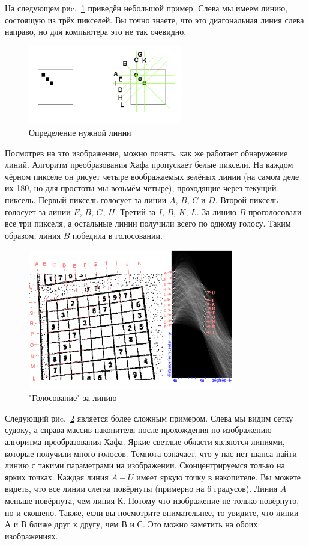 На следующем риc.~\ref{fig:fig26} приведён небольшой пример. Слева мы имеем линию, состоящую из трёх пикселей. Вы точно знаете, что это диагональная линия слева направо, но для компьютера это не так очевидно. 
\begin{figure}[ht!]
  \centering
  \includegraphics[width=0.6\textwidth]{inc/raster/design2-6.png}
  \caption{Определение нужной линии}
  \label{fig:fig26}
\end{figure}

Посмотрев на это изображение, можно понять, как же работает обнаружение линий. Алгоритм преобразования Хафа пропускает белые пиксели. На каждом чёрном пикселе он рисует четыре воображаемых зелёных линии (на самом деле их 180, но для простоты мы возьмём четыре), проходящие через текущий пиксель. Первый пиксель голосует за линии $A$, $B$, $C$ и $D$. Второй пиксель голосует за линии $E$, $B$, $G$, $H$. Третий за $I$, $B$, $K$, $L$. За линию $B$ проголосовали все три пикселя, а остальные линии получили всего по одному голосу. Таким образом, линия $B$ победила в голосовании.

\begin{figure}[ht!]
  \centering
  \includegraphics[width=0.8\textwidth]{inc/raster/design2-7.png}
  \caption{"Голосование" за линию}
  \label{fig:fig27}
\end{figure}
Следующий риc.~\ref{fig:fig27} является более сложным примером. Слева мы видим сетку судоку, а справа массив накопителя после прохождения по изображению алгоритма преобразования Хафа. Яркие светлые области являются линиями, которые получили много голосов. Темнота означает, что у нас нет шанса найти линию с такими параметрами на изображении. Сконцентрируемся только на ярких точках. Каждая линия $A-U$ имеет яркую точку в накопителе. Вы можете видеть, что все линии слегка повёрнуты (примерно на 6 градусов). Линия $A$ меньше повёрнута, чем линия $К$. Потому что изображение не только повёрнуто, но и скошено. Также, если вы посмотрите внимательнее, то увидите, что линии $А$ и $В$ ближе друг к другу, чем $В$ и $С$. Это можно заметить на обоих изображениях.


